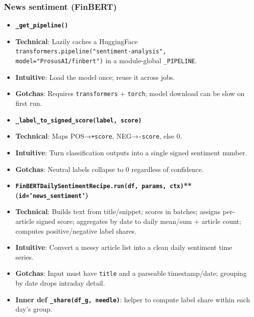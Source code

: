 \documentclass[11pt]{article}
\begin{document}
\subsubsection{News sentiment (FinBERT)}

\begin{itemize}[leftmargin=*,nosep]
\item \textbf{\texttt{\_get\_pipeline()}}
\item \textbf{Technical}: Lazily caches a HuggingFace \texttt{transformers.pipeline("sentiment-analysis", model="ProsusAI/finbert")} in a module-global \texttt{\_PIPELINE}.
\item \textbf{Intuitive}: Load the model once; reuse it across jobs.
\item \textbf{Gotchas}: Requires \texttt{transformers} + \texttt{torch}; model download can be slow on first run.
\item \textbf{\texttt{\_label\_to\_signed\_score(label, score)}}
\item \textbf{Technical}: Maps POS→\texttt{+score}, NEG→\texttt{-score}, else 0.
\item \textbf{Intuitive}: Turn classification outputs into a single signed sentiment number.
\item \textbf{Gotchas}: Neutral labels collapse to 0 regardless of confidence.
\item \textbf{\texttt{FinBERTDailySentimentRecipe.run(df, params, ctx)}** (\texttt{id='news\_sentiment'})}
\item \textbf{Technical}: Builds text from title/snippet; scores in batches; assigns per-article signed score; aggregates by date to daily mean/sum + article count; computes positive/negative label shares.
\item \textbf{Intuitive}: Convert a messy article list into a clean daily sentiment time series.
\item \textbf{Gotchas}: Input must have \texttt{title} and a parseable timestamp/date; grouping by date drops intraday detail.
\item \textbf{Inner def \texttt{\_share(df\_g, needle)}}: helper to compute label share within each day’s group.
\end{itemize}
\end{document}
